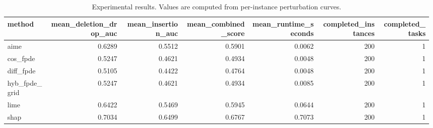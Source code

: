 \begin{table}[t]
\caption{Experimental results. Values are computed from per-instance perturbation curves.}
\label{tab:main_results_computed}
\centering
\begin{tabular}{lrrrrrr}
\toprule
method & mean\_deletion\_drop\_auc & mean\_insertion\_auc & mean\_combined\_score & mean\_runtime\_seconds & completed\_instances & completed\_tasks \\
\midrule
aime & 0.6289 & 0.5512 & 0.5901 & 0.0062 & 200 & 1 \\
cos\_fpde & 0.5247 & 0.4621 & 0.4934 & 0.0048 & 200 & 1 \\
diff\_fpde & 0.5105 & 0.4422 & 0.4764 & 0.0048 & 200 & 1 \\
hyb\_fpde\_grid & 0.5247 & 0.4621 & 0.4934 & 0.0085 & 200 & 1 \\
lime & 0.6422 & 0.5469 & 0.5945 & 0.0644 & 200 & 1 \\
shap & 0.7034 & 0.6499 & 0.6767 & 0.7073 & 200 & 1 \\
\bottomrule
\end{tabular}

\end{table}
